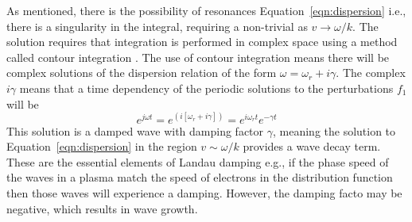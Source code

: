 As mentioned, there is the possibility of resonances Equation~\ref{eqn:dispersion} i.e., there is a singularity in the integral, requiring a non-trivial as $v \rightarrow \omega/k$. The solution requires that integration is performed in complex space using a method called contour integration \citep{melrose1989}. The use of contour integration means there will be complex solutions of the dispersion relation of the form $\omega = \omega_r + i\gamma$.
The complex $i\gamma$ means that a time dependency of the periodic solutions to the perturbations $f_1$ will be 
\begin{equation}
e^{j\omega t}=e^{(i[\omega_r + i\gamma])}=e^{i\omega_rt}e^{-\gamma t}
\label{eqn:growth}
\end{equation}
This solution is a damped wave with damping factor $\gamma$, meaning the solution to Equation~\ref{eqn:dispersion} in the region $v \sim \omega/k$ provides a wave decay term. These are the essential elements of Landau damping e.g., if the phase speed of the waves in a plasma match the speed of electrons in the distribution function then those waves will experience a damping. However, the damping facto may be negative, which results in wave growth.

